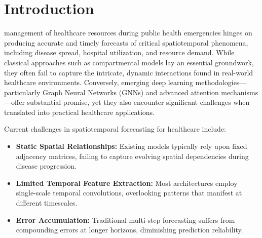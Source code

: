 \documentclass[lettersize, journal]{IEEEtran}
\begin{document}
\section{Introduction}

 management of healthcare resources during public health emergencies hinges on producing accurate and timely forecasts of critical spatiotemporal phenomena, including disease spread, hospital utilization, and resource demand. While classical approaches such as compartmental models \cite{compartmentalmodel} lay an essential groundwork, they often fail to capture the intricate, dynamic interactions found in real-world healthcare environments. Conversely, emerging deep learning methodologies—particularly Graph Neural Networks (GNNs) \cite{gnn_survey} and advanced attention mechanisms \cite{attention_mechanisms}—offer substantial promise, yet they also encounter significant challenges when translated into practical healthcare applications.

Current challenges in spatiotemporal forecasting for healthcare include:

\begin{itemize}
\item \textbf{Static Spatial Relationships:} Existing models typically rely upon fixed adjacency matrices, failing to capture evolving spatial dependencies during disease progression.
\item \textbf{Limited Temporal Feature Extraction:} Most architectures employ single-scale temporal convolutions, overlooking patterns that manifest at different timescales.
\item \textbf{Error Accumulation:} Traditional multi-step forecasting suffers from compounding errors at longer horizons, diminishing prediction reliability.
\end{itemize}
\end{document}
